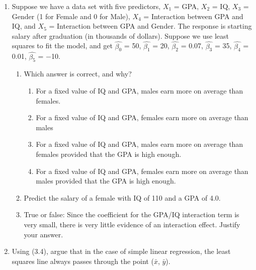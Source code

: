            \begin{enumerate}
           \item Suppose we have a data set with five predictors, \(X_1\) = GPA, \(X_2\) = IQ, \(X_3\) = Gender (1 for Female and 0 for Male), $X_4$ = Interaction between GPA and IQ, and $X_5$ = Interaction between GPA and Gender. The response is starting salary after graduation (in thousands of dollars). Suppose we use least squares to fit the model, and get $\hat{\beta_0}$ = 50, $\hat{\beta_1}$ = 20, $\hat{\beta_2}$ = 0.07, $\hat{\beta_3}$ = 35, $\hat{\beta_4}$ = 0.01, $\hat{\beta_5}$ = −10.
           \begin{enumerate}
           \item Which answer is correct, and why?
           \begin{enumerate}
           \item For a fixed value of IQ and GPA, males earn more on average than females.\\

           \item For a fixed value of IQ and GPA, females earn more on average than males \\

           \item For a fixed value of IQ and GPA, males earn more on average than females provided that the GPA is high enough.\\

           \item For a fixed value of IQ and GPA, females earn more on average than males provided that the GPA is high enough.\\

           \end{enumerate} %
           \item Predict the salary of a female with IQ of 110 and a GPA of 4.0. \\ %

           \item True or false: Since the coefficient for the GPA/IQ interaction term is very small, there is very little evidence of an interaction effect. Justify your answer.\\ %

\end{enumerate} %

\item Using (3.4), argue that in the case of simple linear regression, the least squares line always passes through the point ($\bar{x}$, $\bar{y}$). \\ %


\end{enumerate}
